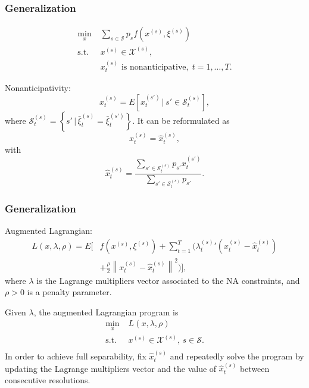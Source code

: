 \documentclass[french]{beamer}
\def\cS{\mathcal{S}}
\def\cX{\mathcal{X}}
\begin{document}
\begin{frame}
\frametitle{Generalization}

$$
\begin{aligned}
\min_{x}\; & \sum_{s \in \cS} p_s f\left(x^{(s)}, \xi^{(s)}\right)\\
\text{s.t. } & x^{(s)} \in \cX^{(s)},\\
& x_t^{(s)} \mbox{ is nonanticipative},\; t = 1, \dots, T.
\end{aligned}
$$

Nonanticipativity:
$$
x_t^{(s)} = E\left[ x_t^{(s')} \,\big|\, s' \in \cS_t^{(s)} \right],
$$
where $\cS_t^{(s)} = \left\{ s' \,\big|\, \bar{\xi}_t^{(s)} = \bar{\xi}_t^{(s') }\right\}$.
It can be reformulated as
\[
x_t^{(s)} = \hat{x}_t^{(s)},
\]
with
$$
\hat{x}_t^{(s)} = \frac{\sum_{s' \in \cS_{t}^{(s)}} p_{s'} x_t^{(s')}}{\sum_{s' \in \cS_t^{(s)}} p_{s'}}.
$$

\end{frame}

\begin{frame}
\frametitle{Generalization}

Augmented Lagrangian:
\begin{align*}
L(x,\lambda,\rho) =  E \Biggl[ & f\left( x^{(s)}, \xi^{(s)} \right) + \sum_{t = 1}^T \biggl( {\lambda_t^{(s)}}' \left(x_t^{(s)} - \hat{x}_t^{(s)}\right) \\
& + \frac{\rho}{2} \left\| x_t^{(s)} - \hat{x}_t^{(s)} \right\|^2 \biggr) \Biggr],
\end{align*}
where $\lambda$ is the Lagrange multipliers vector associated to the NA constraints, and $\rho > 0$ is a penalty parameter.

\mbox{}

Given $\lambda$, the augmented Lagrangian program is
\begin{equation}
\begin{aligned}
\min_{x} & \; L(x,\lambda,\rho)\\
\text{s.t.} & \; x^{(s)} \in \mathcal{X}^{(s)}, \, s \in \mathcal{S}.\\
\end{aligned}
\label{Gen-PHA-Form}
\end{equation}
In order to achieve full separability, fix $\hat{x}_t^{(s)}$ and repeatedly solve the program by updating the Lagrange multipliers vector and the value of $\hat{x}_t^{(s)}$ between consecutive resolutions.

\end{frame}
\end{document}
